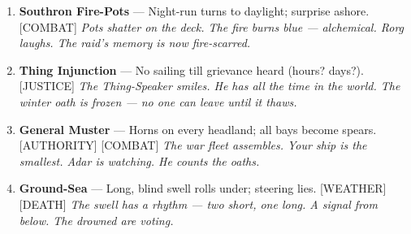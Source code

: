 \begin{enumerate}
\item[J] \textbf{Southron Fire-Pots} --- Night-run turns to daylight; surprise ashore. [COMBAT]
  \hfill \textit{Pots shatter on the deck. The fire burns blue --- alchemical. Rorg laughs. The raid's memory is now fire-scarred.}
\item[Q] \textbf{Thing Injunction} --- No sailing till grievance heard (hours? days?). [JUSTICE]
  \hfill \textit{The Thing-Speaker smiles. He has all the time in the world. The winter oath is frozen --- no one can leave until it thaws.}
\item[K] \textbf{General Muster} --- Horns on every headland; all bays become spears. [AUTHORITY] [COMBAT]
  \hfill \textit{The war fleet assembles. Your ship is the smallest. Adar is watching. He counts the oaths.}
\item[A] \textbf{Ground-Sea} --- Long, blind swell rolls under; steering lies. [WEATHER] [DEATH]
  \hfill \textit{The swell has a rhythm --- two short, one long. A signal from below. The drowned are voting.}
\end{enumerate}

